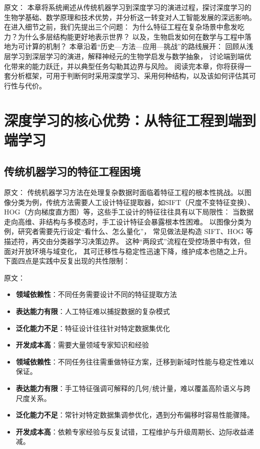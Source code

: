 原文：
本章将系统阐述从传统机器学习到深度学习的演进过程，探讨深度学习的生物学基础、数学原理和技术优势，并分析这一转变对人工智能发展的深远影响。
在进入细节之前，我们先提出三个问题：  
为什么特征工程在复杂场景中愈发吃力？为什么多层结构能更好地表示世界？  
以及，生物启发如何在数学与工程中落地为可计算的机制？  
本章沿着“历史—方法—应用—挑战”的路线展开：  
回顾从浅层学习到深层学习的演进，解释神经元的生物学启发与数学抽象，  
讨论端到端优化带来的能力跃迁，并以典型任务勾勒其边界与风险。  
阅读完本章，你将获得一套分析框架，可用于判断何时采用深度学习、采用何种结构，以及该如何评估其可行性与代价。


\section{深度学习的核心优势：从特征工程到端到端学习}

\subsection{传统机器学习的特征工程困境}

原文：
传统机器学习方法在处理复杂数据时面临着特征工程的根本性挑战。以图像分类为例，传统方法需要人工设计特征提取器，如SIFT（尺度不变特征变换）、HOG（方向梯度直方图）等，这些手工设计的特征往往具有以下局限性：
当数据走向高维、非结构与多模态时，手工设计特征会暴露根本性困难。  
以图像分类为例，研究者需要先行设定“看什么、怎么量化”，  
常见做法是构造 SIFT、HOG 等描述符，再交由分类器学习决策边界。  
这种“两段式”流程在受控场景中有效，但面对开放环境与域变化，  
其可迁移性与稳定性迅速下降，维护成本也随之上升。  
下面四点是实践中反复出现的共性限制：

原文：
\begin{itemize}
\item {\bf 领域依赖性}：不同任务需要设计不同的特征提取方法
\item {\bf 表达能力有限}：人工特征难以捕捉数据的复杂模式
\item {\bf 泛化能力不足}：特征设计往往针对特定数据集优化
\item {\bf 开发成本高}：需要大量领域专家知识和经验
\end{itemize}
\begin{itemize}
\item {\bf 领域依赖性}：不同任务往往需重做特征方案，迁移到新域时性能与稳定性难以保证。
\item {\bf 表达能力有限}：手工特征强调可解释的几何/统计量，难以覆盖高阶语义与跨尺度关系。
\item {\bf 泛化能力不足}：常针对特定数据集调参优化，遇到分布偏移时容易性能骤降。
\item {\bf 开发成本高}：依赖专家经验与反复试错，工程维护与升级周期长、边际收益递减。
\end{itemize}


